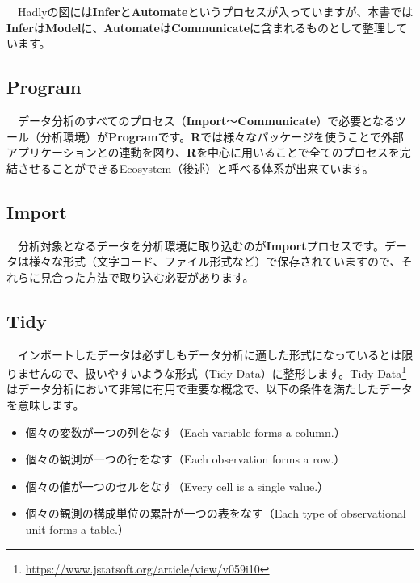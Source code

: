 \documentclass[
  12pt,
]{book}
\DeclareRobustCommand{\href}[2]{#2\footnote{\url{#1}}}
\providecommand{\tightlist}{%
  \setlength{\itemsep}{0pt}\setlength{\parskip}{0pt}}
\begin{document}
　Hadlyの図には\textbf{Infer}と\textbf{Automate}というプロセスが入っていますが、本書では\textbf{Infer}は\textbf{Model}に、\textbf{Automate}は\textbf{Communicate}に含まれるものとして整理しています。

\newpage

\hypertarget{program}{%
\subsection*{Program}\label{program}}

　データ分析のすべてのプロセス（\textbf{Import}〜\textbf{Communicate}）で必要となるツール（分析環境）が\textbf{Program}です。\textbf{R}では様々なパッケージを使うことで外部アプリケーションとの連動を図り、\textbf{R}を中心に用いることで全てのプロセスを完結させることができるEcosystem（後述）と呼べる体系が出来ています。

\hypertarget{import}{%
\subsection*{Import}\label{import}}

　分析対象となるデータを分析環境に取り込むのが\textbf{Import}プロセスです。データは様々な形式（文字コード、ファイル形式など）で保存されていますので、それらに見合った方法で取り込む必要があります。

\hypertarget{tidy}{%
\subsection*{Tidy}\label{tidy}}

　インポートしたデータは必ずしもデータ分析に適した形式になっているとは限りませんので、扱いやすいような形式（Tidy Data）に整形します。\href{https://www.jstatsoft.org/article/view/v059i10}{Tidy Data}\citep{R-TidyData}はデータ分析において非常に有用で重要な概念で、以下の条件を満たしたデータを意味します。

\begin{itemize}
\tightlist
\item
  個々の変数が一つの列をなす（Each variable forms a column.）
\item
  個々の観測が一つの行をなす（Each observation forms a row.）
\item
  個々の値が一つのセルをなす（Every cell is a single value.）
\item
  個々の観測の構成単位の累計が一つの表をなす（Each type of observational unit forms a table.）
\end{itemize}
\end{document}
